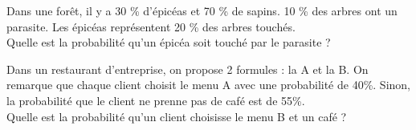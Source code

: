\documentclass[a4paper,11pt,exos]{nsi} %
\begin{document}
\exo{}

Dans une forêt, il y a 30 \% d'épicéas et 70 \% de sapins. 10 \% des arbres ont un parasite. Les épicéas représentent 20 \% des arbres touchés.\\

Quelle est la probabilité qu'un épicéa soit touché par le parasite ?\\



Dans un restaurant d'entreprise, on propose 2 formules : la A et la B. On remarque que chaque client choisit le menu A avec une probabilité de 40\%.
Sinon, la probabilité que le client ne prenne pas de café est de 55\%.\\

Quelle est la probabilité qu'un client choisisse le menu B et un café ?\\
\end{document}
